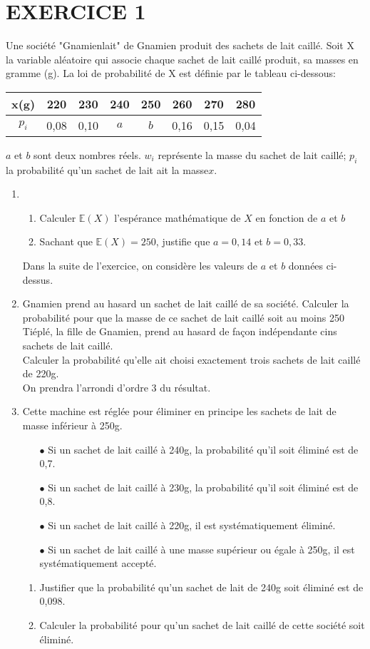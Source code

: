 \documentclass[12pts]{book}
\begin{document}
	\section*{EXERCICE 1}	
	Une société "Gnamienlait" de Gnamien produit des sachets de lait caillé. Soit X la variable aléatoire qui associe chaque sachet de lait caillé produit, sa masses en gramme (g). La loi de probabilité de X est définie par le tableau ci-dessous:
	\begin{tabular}{|c|c|c|c|c|c|c|c|}
		\hline 
		x(g) & 220 &230 & 240 & 250 & 260 & 270 & 280 \\ \hline 
		$p_i$ & 0,08& 0,10 & $a$ &$b$& 0,16 & 0,15 & 0,04 
	\\	\hline
	\end{tabular}
	$a$ et $b$ sont deux nombres réels.
	$w_i$ représente la masse du sachet de lait caillé; $p_i$ la probabilité qu'un sachet de lait ait la masse$x$.
	\begin{enumerate}
		\item \begin{enumerate}
			\item Calculer $\mathbb{E}(X)$ l'espérance mathématique de $X$ en fonction de $a$ et $b$
			\item Sachant que $\mathbb{E}(X)=250$, justifie que $a=0,14$ et $b=0,33.$ 
		\end{enumerate}
	Dans la suite de l'exercice, on considère les valeurs de $a$ et $b$ données ci-dessus.
	\item Gnamien prend au hasard un sachet de lait caillé de sa société.  Calculer la probabilité pour que la masse de ce sachet de lait caillé soit au moins 250\\
	Tiéplé, la fille de Gnamien, prend au hasard de façon indépendante cins sachets de lait caillé.\\
	Calculer la probabilité qu'elle ait choisi exactement trois sachets de lait caillé de 220g.\\
	On prendra l'arrondi d'ordre 3 du résultat.
	\item Cette machine est réglée pour éliminer en principe les sachets de lait de masse inférieur à 250g.
		\begin{enumerate}
			\item[$\bullet$] Si un sachet de lait caillé à 240g, la probabilité qu'il soit éliminé est de 0,7.
			\item[$\bullet$] Si un sachet de lait caillé à 230g, la probabilité qu'il soit éliminé est de 0,8.
			\item[$\bullet$] Si un sachet de lait caillé à 220g, il est systématiquement éliminé.
			\item[$\bullet$] Si un sachet  de lait caillé à une masse supérieur ou égale à 250g, il est systématiquement accepté.
		\end{enumerate}
	\begin{enumerate}
		\item Justifier que la probabilité qu'un sachet de lait de 240g soit éliminé est de 0,098.
		\item Calculer la probabilité pour qu'un sachet de lait caillé de cette société soit éliminé.
	\end{enumerate}
	\end{enumerate}
	
\end{document}
